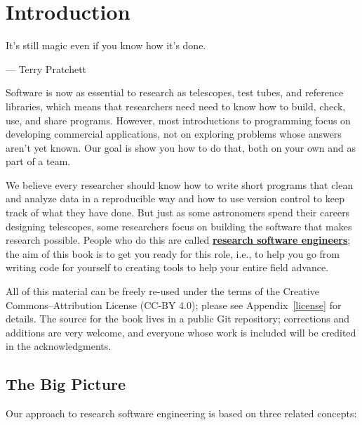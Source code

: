 \documentclass[
]{krantz}
\renewenvironment{quote}{\begin{VF}}{\end{VF}}
\newcommand{\gref}[2]{\hyperlink{#2}{\textbf{#1}}}
\begin{document}
{
\setcounter{tocdepth}{1}
\tableofcontents
}
\listoffigures
\mainmatter

\hypertarget{intro}{%
\chapter{Introduction}\label{intro}}

\begin{quote}
It's still magic even if you know how it's done.

--- Terry Pratchett
\end{quote}

Software is now as essential to research as telescopes, test tubes, and reference libraries,
which means that researchers need need to know how to build, check, use, and share programs.
However,
most introductions to programming focus on developing commercial applications,
not on exploring problems whose answers aren't yet known.
Our goal is show you how to do that,
both on your own and as part of a team.

We believe every researcher should know
how to write short programs that clean and analyze data in a reproducible way
and how to use version control to keep track of what they have done.
But just as some astronomers spend their careers designing telescopes,
some researchers focus on building the software that makes research possible.
People who do this are called \gref{research software engineers}{rse};
the aim of this book is to get you ready for this role,
i.e.,
to help you go from writing code for yourself
to creating tools to help your entire field advance.

All of this material can be freely re-used
under the terms of the Creative Commons--Attribution License (CC-BY 4.0);
please see Appendix~\ref{license} for details.
The source for the book lives in a public Git repository;
corrections and additions are very welcome,
and everyone whose work is included will be credited in the acknowledgments.

\hypertarget{intro-big-picture}{%
\section{The Big Picture}\label{intro-big-picture}}

Our approach to research software engineering is based on three related concepts:
\end{document}
